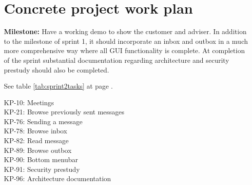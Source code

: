 \section{Concrete project work plan}

\textbf{Milestone:} Have a working demo to show the customer and adviser. In addition to the milestone of sprint 1, it should incorporate an inbox and outbox in a much more comprehensive way where all GUI functionality is complete. At completion of the sprint substantial documentation regarding architecture and security prestudy should also be completed.

See table \ref{tab:sprint2tasks} at page \pageref{tab:sprint2tasks}.
\begin{table}
KP-10: Meetings\\
KP-21: Browse previously sent messages\\
KP-76: Sending a message\\
KP-78: Browse inbox\\
KP-82: Read message\\
KP-89: Browse outbox\\
KP-90: Bottom menubar\\
KP-91: Security prestudy\\
KP-96: Architecture documentation\\


\end{table}

